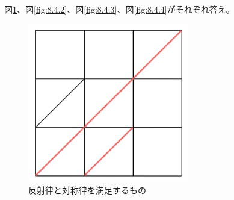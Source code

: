 \documentclass{jsarticle}
\begin{document}
\subsection{}
図\ref{fig:8.4.1}、図\ref{fig:8.4.2}、図\ref{fig:8.4.3}、図\ref{fig:8.4.4}がそれぞれ答え。
\begin{figure}[htbp]
  \begin{center}
    \includegraphics[clip,width=7.0cm]{8_4/8_4_1.png}
    \caption{反射律と対称律を満足するもの}
    \label{fig:8.4.1}
  \end{center}
\end{figure}
\end{document}
